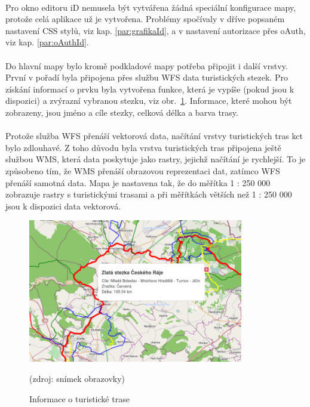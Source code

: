 \documentclass[11pt,a4paper,titlepage,oneside]{book}
\begin{document}
			\paragraph{} Pro okno editoru iD nemusela být vytvářena žádná speciální konfigurace mapy, protože celá aplikace už je vytvořena.  Problémy spočívaly v dříve popsaném nastavení \ac{CSS} stylů, viz kap. \ref{par:grafikaId}, a v nastavení autorizace přes oAuth, viz kap. \ref{par:oAuthId}.

			\paragraph{} Do hlavní mapy bylo kromě podkladové mapy potřeba připojit i další vrstvy. První v pořadí byla připojena přes službu \ac{WFS} data turistických stezek. Pro získání informací o prvku byla vytvořena funkce, která je vypíše (pokud jsou k dispozici) a zvýrazní vybranou stezku, viz obr.~\ref{fig:infoTrack}. Informace, které mohou být zobrazeny, jsou jméno a cíle stezky, celková délka a barva trasy.


			\paragraph{}Protože služba \ac{WFS} přenáší vektorová data, načítání vrstvy turistických tras \ac{kct} bylo zdlouhavé. Z toho důvodu byla vrstva turistických tras připojena ještě službou \ac{WMS}, která data poskytuje jako rastry, jejichž načítání je rychlejší. To je způsobeno tím, že \ac{WMS} přenáší obrazovou reprezentaci dat, zatímco \ac{WFS} přenáší samotná data. Mapa je nastavena tak, že do měřítka 1 : 250 000 zobrazuje rastry s turistickými trasami  a při měřítkách větších než 1 : 250 000 jsou k dispozici data vektorová.
		\begin{figure}[!h]
			\begin{center}
				\includegraphics[width=9.4cm]{obrazky/toulavej/infoTrack.png}
				\caption{Informace o turistické trase}
				\label{fig:infoTrack}
				(zdroj: snímek obrazovky)
			\end{center}
		\end{figure}	
\end{document}
